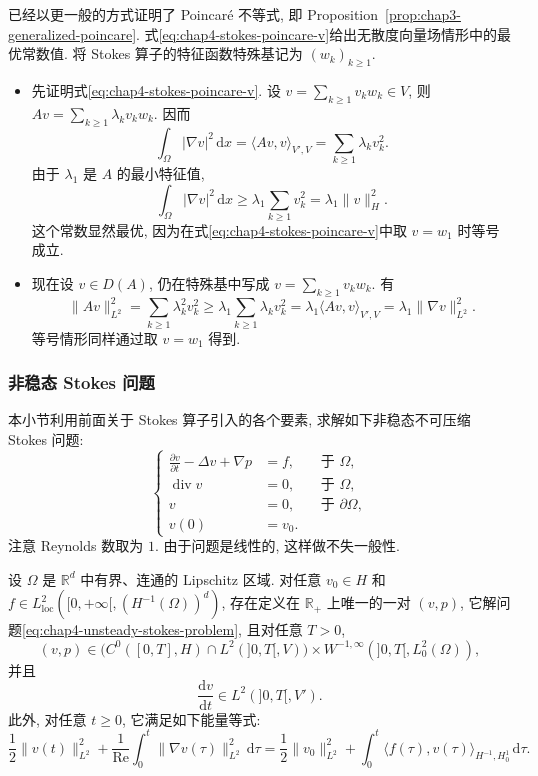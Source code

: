 \begin{Proof}
已经以更一般的方式证明了 Poincaré 不等式, 即 Proposition~\ref{prop:chap3-generalized-poincare}. 式\eqref{eq:chap4-stokes-poincare-v}给出无散度向量场情形中的最优常数值. 将 Stokes 算子的特征函数特殊基记为 $(w_k)_{k\geq1}$.
\begin{itemize}
 \item 先证明式\eqref{eq:chap4-stokes-poincare-v}. 设 $v=\sum_{k\geq1}v_kw_k\in V$, 则 $Av=\sum_{k\geq1}\lambda_kv_kw_k$. 因而
 \[
  \int_\Omega|\nabla v|^2\,\mathrm dx
  =\langle Av,v\rangle_{V',V}
  =\sum_{k\geq1}\lambda_kv_k^2.
 \]
 由于 $\lambda_1$ 是 $A$ 的最小特征值,
 \[
  \int_\Omega|\nabla v|^2\,\mathrm dx
  \geq\lambda_1\sum_{k\geq1}v_k^2
  =\lambda_1\|v\|_H^2.
 \]
 这个常数显然最优, 因为在式\eqref{eq:chap4-stokes-poincare-v}中取 $v=w_1$ 时等号成立.

 \item 现在设 $v\in D(A)$, 仍在特殊基中写成 $v=\sum_{k\geq1}v_kw_k$. 有
 \[
  \|Av\|_{L^2}^2
  =\sum_{k\geq1}\lambda_k^2v_k^2
  \geq\lambda_1\sum_{k\geq1}\lambda_kv_k^2
  =\lambda_1\langle Av,v\rangle_{V',V}
  =\lambda_1\|\nabla v\|_{L^2}^2.
 \]
 等号情形同样通过取 $v=w_1$ 得到.
\end{itemize}
\end{Proof}

\subsubsection{非稳态 Stokes 问题}
\label{subsec:chap4-unsteady-stokes}

本小节利用前面关于 Stokes 算子引入的各个要素, 求解如下非稳态不可压缩 Stokes 问题:
\begin{equation}
 \left\{
 \begin{aligned}
  \frac{\partial v}{\partial t}-\Delta v+\nabla p&=f,&&\text{于 }\Omega,\\
  \operatorname{div}v&=0,&&\text{于 }\Omega,\\
  v&=0,&&\text{于 }\partial\Omega,\\
  v(0)&=v_0.
 \end{aligned}
 \right.
 \label{eq:chap4-unsteady-stokes-problem}
\end{equation}
注意 Reynolds 数取为 $1$. 由于问题是线性的, 这样做不失一般性.

\pagebreak[4]
\begin{Theorem}
\label{thm:chap4-unsteady-stokes-wellposedness}
设 $\Omega$ 是 $\mathbb R^d$ 中有界、连通的 Lipschitz 区域. 对任意 $v_0\in H$ 和 $f\in L_{\mathrm{loc}}^2([0,+\infty[,(H^{-1}(\Omega))^d)$, 存在定义在 $\mathbb R_+$ 上唯一的一对 $(v,p)$, 它解问题\eqref{eq:chap4-unsteady-stokes-problem}, 且对任意 $T>0$,
\[
 (v,p)\in\bigl(C^0([0,T],H)\cap L^2(]0,T[,V)\bigr)
 \times W^{-1,\infty}(]0,T[,L_0^2(\Omega)),
\]
并且
\[
 \frac{\mathrm dv}{\mathrm dt}\in L^2(]0,T[,V').
\]
此外, 对任意 $t\geq0$, 它满足如下能量等式:
\[
 \frac12\|v(t)\|_{L^2}^2
 +\frac1{\operatorname{Re}}\int_0^t\|\nabla v(\tau)\|_{L^2}^2\,\mathrm d\tau
 =\frac12\|v_0\|_{L^2}^2
 +\int_0^t\langle f(\tau),v(\tau)\rangle_{H^{-1},H_0^1}\,\mathrm d\tau.
\]
\end{Theorem}

